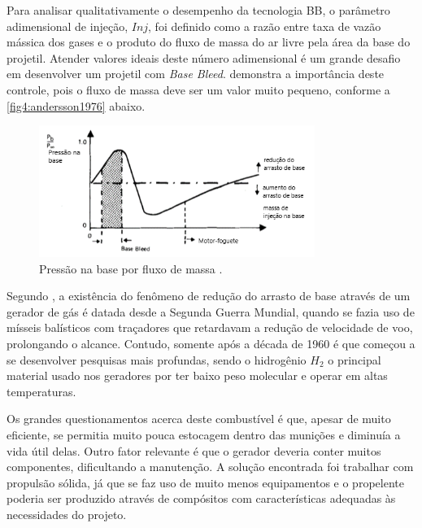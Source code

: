 Para analisar qualitativamente o desempenho da tecnologia BB, o parâmetro adimensional de injeção, $Inj$, foi definido como a razão entre taxa de vazão mássica dos gases e o produto do fluxo de massa do ar livre pela área da base do projetil. Atender valores ideais deste número adimensional é um grande desafio em desenvolver um projetil com \textit{Base Bleed}. \citeauthor{Andersson1976} demonstra a importância deste controle, pois o fluxo de massa deve ser um valor muito pequeno, conforme a \autoref{fig4:andersson1976} abaixo.

\begin{figure}[!ht]
	\centering
	\includegraphics[width=0.8\textwidth]{foto04-grafico-andersson1976.png}
	\caption[Pressão na base por fluxo de massa.]{Pressão na base por fluxo de massa \cite{Andersson1976}.}
	\label{fig4:andersson1976}
\end{figure}

Segundo \citeauthor{Jelic2016Aug}, a existência do fenômeno de redução do arrasto de base através de um gerador de gás é datada desde a Segunda Guerra Mundial, quando se fazia uso de mísseis balísticos com traçadores que retardavam a redução de velocidade de voo, prolongando o alcance. Contudo, somente após a década de 1960 é que começou a se desenvolver pesquisas mais profundas, sendo o hidrogênio \(H_2\) o principal material usado nos geradores por ter baixo peso molecular e operar em altas temperaturas.

Os grandes questionamentos acerca deste combustível é que, apesar de muito eficiente, se permitia muito pouca estocagem dentro das munições e diminuía a vida útil delas. Outro fator relevante é que o gerador deveria conter muitos componentes, dificultando a manutenção. A solução encontrada foi trabalhar com propulsão sólida, já que se faz uso de muito menos equipamentos e o propelente poderia ser produzido através de compósitos com características adequadas às necessidades do projeto.

